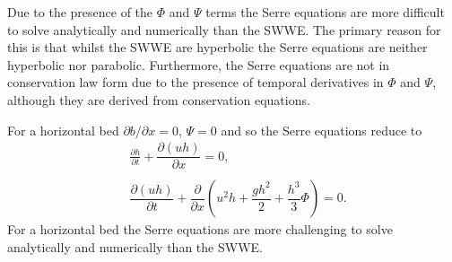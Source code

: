 Due to the presence of the $\Phi$ and $\Psi$ terms the Serre equations are more difficult to solve analytically and numerically than the SWWE. The primary reason for this is that whilst the SWWE are hyperbolic the Serre equations are neither hyperbolic nor parabolic. Furthermore, the Serre equations are not in conservation law form due to the presence of temporal derivatives in $\Phi$ and $\Psi$, although they are derived from conservation equations. 

For a horizontal bed $\partial b / \partial x = 0$, $\Psi = 0$ and so the Serre equations reduce to
\begin{subequations}
	\label{eqn:FullSerreNonConHorizbed}
	\begin{align}
	\label{eqn:FullSerreNonConMassHorizbed}
	&\frac{\partial h}{\partial t} + \dfrac{\partial (uh)}{\partial x} = 0, \\ \nonumber \\
	\label{eqn:FullSerreNonConMomeHorizbed}
	&\dfrac{\partial (uh)}{\partial t} + \dfrac{\partial}{\partial x} \left ( u^2h + \dfrac{gh^2}{2} + \dfrac{h^3}{3}{ \Phi }  \right ) = 0.
	\end{align}
\end{subequations}	
For a horizontal bed the Serre equations are more challenging to solve analytically and numerically than the SWWE. 


